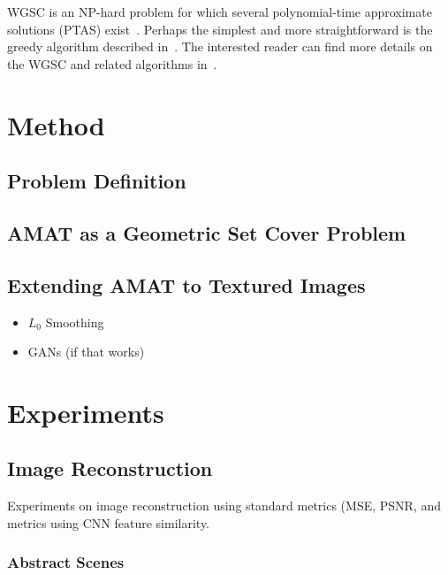 \documentclass[10pt,twocolumn,letterpaper]{article}
\begin{document}
WGSC is an NP-hard problem for which several polynomial-time approximate solutions (PTAS) exist~\cite{PTAS algos for WGSC}.
Perhaps the simplest and more straightforward is the greedy algorithm described in~\cite{Vazirani}. 
The interested reader can find more details on the WGSC and related algorithms in~\cite{other WGSC works}.


\section{Method}\label{sec:method}
\subsection{Problem Definition}\label{sec:definition}

\subsection{AMAT as a Geometric Set Cover Problem}

\subsection{Extending AMAT to Textured Images}
\begin{itemize}
\item $L_0$ Smoothing
\item GANs (if that works)
\end{itemize}

\section{Experiments}\label{sec:experiments}
\subsection{Image Reconstruction}
Experiments on image reconstruction using standard metrics (MSE, PSNR, and metrics using CNN feature similarity.

\subsubsection*{Abstract Scenes}
\end{document}
